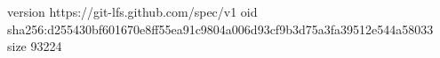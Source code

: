 version https://git-lfs.github.com/spec/v1
oid sha256:d255430bf601670e8ff55ea91c9804a006d93cf9b3d75a3fa39512e544a58033
size 93224
